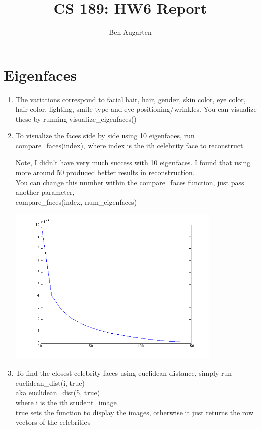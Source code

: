 \documentclass[11pt]{article}
\author{Ben Augarten}
\title{CS 189: HW6 Report}
\begin{document}
\maketitle
\section{Eigenfaces}
\begin{enumerate}
\item
The variations correspond to facial hair, hair, gender, skin color, eye color, hair color, lighting, smile type and eye positioning/wrinkles. You can visualize these by running visualize\_eigenfaces()
\item
To visualize the faces side by side using 10 eigenfaces, run
compare\_faces(index), where index is the ith celebrity face to reconstruct

Note, I didn't have very much success with 10 eigenfaces. I found that using more around 50 produced better results in reconstruction.\\
You can change this number within the compare\_faces function, just pass another parameter,\\
compare\_faces(index, num\_eigenfaces)

\includegraphics[width=\textwidth,height=3in]{L_2_err.png}

\item
To find the closest celebrity faces using euclidean distance, simply run\\
euclidean\_dist(i, true)\\
aka euclidean\_dist(5, true)\\

where i is the ith student\_image\\
true sets the function to display the images, otherwise it just returns the row vectors of the celebrities


\end{enumerate}
\end{document}
